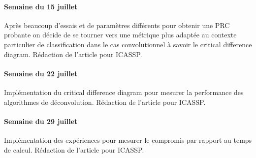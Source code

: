\documentclass[9pt,a4paper,twoside]{rho}
\begin{document}

\paragraph{Semaine du 15 juillet}
Après beaucoup d'essais et de paramètres différents pour obtenir une PRC probante on décide de se tourner vers une métrique plus adaptée au contexte particulier de classification dans le cas convolutionnel à savoir le critical difference diagram.
Rédaction de l'article pour ICASSP.



\paragraph{Semaine du 22 juillet}
Implémentation du critical difference diagram pour mesurer la performance des algorithmes de déconvolution.
Rédaction de l'article pour ICASSP.

\paragraph{Semaine du 29 juillet}
Implémentation des expériences pour mesurer le compromis par rapport au temps de calcul.
Rédaction de l'article pour ICASSP.

\printbibliography
\end{document}

